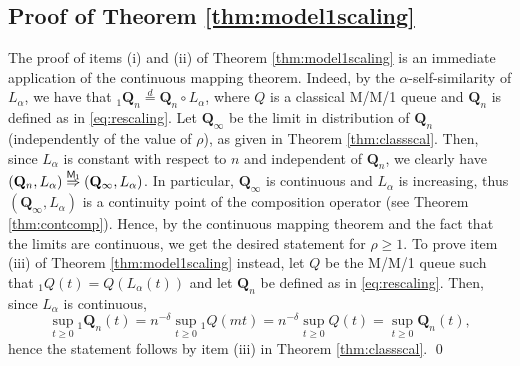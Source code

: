 \documentclass[]{amsart}
\numberwithin{equation}{section}
\theoremstyle{remark}
\theoremstyle{definition}
\begin{document}
\subsection{Proof of Theorem \ref{thm:model1scaling}}\label{sec:proof1}
The proof of items (i) and (ii) of Theorem \ref{thm:model1scaling} is an immediate application of the continuous mapping theorem. Indeed, by the $\alpha$-self-similarity of $L_\alpha$, we have that ${}_1\mathbf{Q}_n\overset{d}{=}\mathbf{Q}_n \circ L_\alpha$, where $Q$ is a classical M/M/1 queue and $\mathbf{Q}_n$ is defined as in \eqref{eq:rescaling}. Let $\mathbf{Q}_\infty$ be the limit in distribution of $\mathbf{Q}_n$ (independently of the value of $\rho$), as given in Theorem \ref{thm:classscal}. Then, since $L_\alpha$ is constant with respect to $n$ and independent of $\mathbf{Q}_n$, we clearly have $(\mathbf{Q}_n,L_\alpha) \overset{\sf M_1}{\Rightarrow} (\mathbf{Q}_\infty,L_\alpha)$. In particular, $\mathbf{Q}_\infty$ is continuous and $L_\alpha$ is increasing, thus $(\mathbf{Q}_\infty,L_\alpha)$ is a continuity point of the composition operator (see Theorem \ref{thm:contcomp}). Hence, by the continuous mapping theorem and the fact that the limits are continuous, we get the desired statement for $\rho \ge 1$. To prove item (iii) of Theorem \ref{thm:model1scaling} instead, let $Q$ be the M/M/1 queue such that ${}_1Q(t)=Q(L_\alpha(t))$ and let $\mathbf{Q}_n$ be defined as in \eqref{eq:rescaling}. Then, since $L_\alpha$ is continuous,
\begin{equation*}
\sup_{t \ge 0} {}_1\mathbf{Q}_n(t)=n^{-\delta}\sup_{t \ge 0}{}_1Q(mt)=n^{-\delta}\sup_{t \ge 0}Q(t)=\sup_{t \ge 0}\mathbf{Q}_n(t),
\end{equation*}
hence the statement follows by item (iii) in Theorem \ref{thm:classscal}.
\hfill \qed
\end{document}
